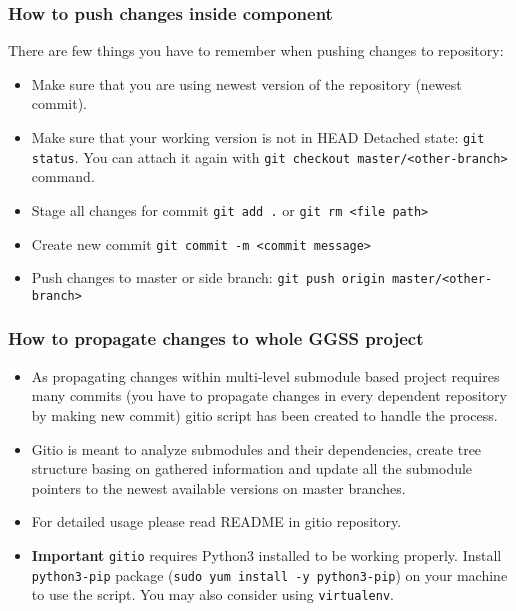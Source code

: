 \subsubsection*{How to push changes inside component}
There are few things you have to remember when pushing changes to repository:
\begin{itemize}
    \item Make sure that you are using newest version of the repository (newest commit).
    \item Make sure that your working version is not in HEAD Detached state: \lstinline{git status}. You can attach it again with \lstinline{git checkout master/<other-branch>} command.
    \item Stage all changes for commit \lstinline{git add .} or \lstinline{git rm <file path>}
    \item Create new commit \lstinline{git commit -m <commit message>}
    \item Push changes to master or side branch: \lstinline{git push origin master/<other-branch>}
\end{itemize}

\subsubsection*{How to propagate changes to whole GGSS project}
\begin{itemize}
    \item As propagating changes within multi-level submodule based project requires many commits (you have to propagate changes in every dependent repository by making new commit) gitio script has been created to handle the process.
    \item Gitio is meant to analyze submodules and their dependencies, create tree structure basing on gathered information and update all the submodule pointers to the newest available versions on master branches.
    \item For detailed usage please read README in gitio repository.
    \item \textbf{Important} \lstinline{gitio} requires Python3 installed to be working properly. Install \lstinline{python3-pip} package (\lstinline{sudo yum install -y python3-pip}) on your machine to use the script. You may also consider using \lstinline{virtualenv}.
\end{itemize}

